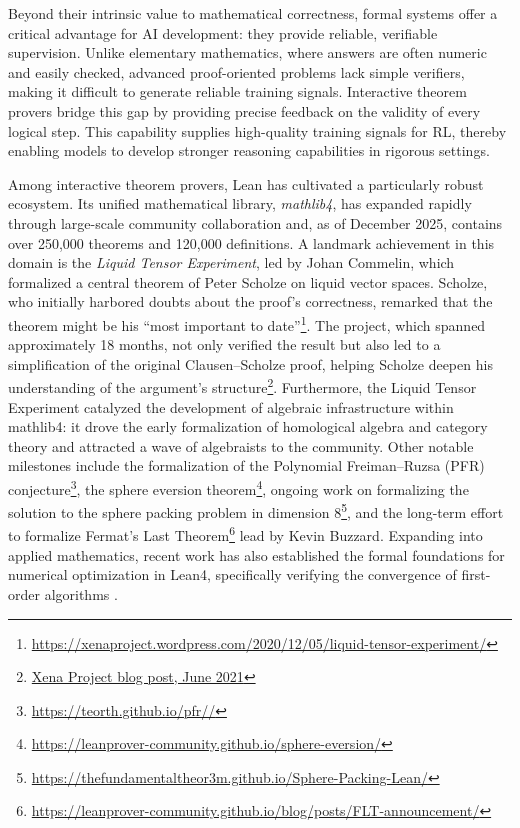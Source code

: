 \documentclass[11pt]{article}
\numberwithin{equation}{section}
\begin{document}
Beyond their intrinsic value to mathematical correctness, formal systems offer a critical advantage for AI development: they provide reliable, verifiable supervision. Unlike elementary mathematics, where answers are often numeric and easily checked, advanced proof-oriented problems lack simple verifiers, making it difficult to generate reliable training signals. Interactive theorem provers bridge this gap by providing precise feedback on the validity of every logical step. This capability supplies high-quality training signals for RL, thereby enabling models to develop stronger reasoning capabilities in rigorous settings.

Among interactive theorem provers, Lean \cite{DBLP:conf/cade/MouraKADR15,DBLP:conf/cade/Moura021} has cultivated a particularly robust ecosystem. Its unified mathematical library, \textit{mathlib4}, has expanded rapidly through large-scale community collaboration and, as of December 2025, contains over 250,000 theorems and 120,000 definitions. A landmark achievement in this domain is the \textit{Liquid Tensor Experiment}, led by Johan Commelin, which formalized a central theorem of Peter Scholze on liquid vector spaces. Scholze, who initially harbored doubts about the proof's correctness, remarked that the theorem might be his ``most important to date''\footnote{\href{https://xenaproject.wordpress.com/2020/12/05/liquid-tensor-experiment/}{https://xenaproject.wordpress.com/2020/12/05/liquid-tensor-experiment/}}. The project, which spanned approximately 18 months, not only verified the result but also led to a simplification of the original Clausen--Scholze proof, helping Scholze deepen his understanding of the argument's structure\footnote{\href{https://xenaproject.wordpress.com/2021/06/05/half-a-year-of-the-liquid-tensor-experiment-amazing-developments/}{Xena Project blog post, June 2021}}. Furthermore, the Liquid Tensor Experiment catalyzed the development of algebraic infrastructure within mathlib4: it drove the early formalization of homological algebra and category theory and attracted a wave of algebraists to the community. Other notable milestones include the formalization of the Polynomial Freiman--Ruzsa (PFR) conjecture\footnote{\href{https://teorth.github.io/pfr//}{https://teorth.github.io/pfr//}}, the sphere eversion theorem\footnote{\href{https://leanprover-community.github.io/sphere-eversion/}{https://leanprover-community.github.io/sphere-eversion/}}, ongoing work on formalizing the solution to the sphere packing problem in dimension 8\footnote{\href{https://thefundamentaltheor3m.github.io/Sphere-Packing-Lean/}{https://thefundamentaltheor3m.github.io/Sphere-Packing-Lean/}}, and the long-term effort to formalize Fermat’s Last Theorem\footnote{\href{https://leanprover-community.github.io/blog/posts/FLT-announcement/}{https://leanprover-community.github.io/blog/posts/FLT-announcement/}} lead by Kevin Buzzard. Expanding into applied mathematics, recent work has also established the formal foundations for numerical optimization in Lean4, specifically verifying the convergence of first-order algorithms \cite{li2025formalization}.
\end{document}
